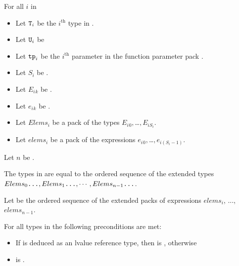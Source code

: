 \documentclass{wg21}
\begin{document}
\begin{itemdescr}  %
    \pnum
    \begin{addedblock}

    For all $i$ in  
        \begin{itemize}
         \item Let $\texttt{T}_i$ be the $i^\text{th}$ type in .
         \item Let $\texttt{U}_i$ be 
         \item Let $\texttt{tp}_i$ be the $i^\text{th}$ parameter in the function parameter pack .
         \item Let $S_i$ be .
         \item Let $E_i$$_k$ be .
         \item Let $e_i$$_k$ be .
         \item Let $Elems_i$ be a pack of the types $E_i$$_0, $\dots$,  E_{iS_{i}}$.
         \item Let $elems_i$ be a pack of the expressions $e_i$$_0, $\dots$,  e_{i(S_{i}-1)}$.
     \end{itemize}

    Let $n$ be .

    The types in  are equal to the ordered
    sequence of the extended types \\
    $Elems_0\texttt{...} , Elems_1\texttt{...} , \cdots , Elems_{n-1}\texttt{...}$.

    Let  be the ordered sequence of the extended packs of expressions $elems_i$, ..., $elems_{n-1}$.

\mandates

    For all types  in  the following preconditions are met:
    \begin{itemize}
        \item If  is deduced as an lvalue reference type, then
         is , otherwise
        \item {}  is .
    \end{itemize}

\returns
    \end{addedblock}
    \begin{removedblock}




\end{removedblock}
\end{itemdescr}
\end{document}

